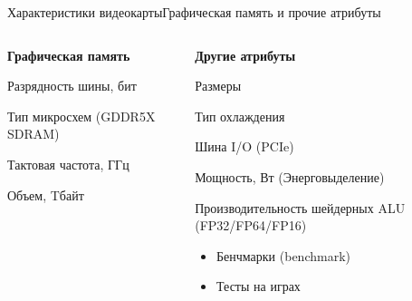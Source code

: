 \documentclass{beamer}
\begin{document}
\begin{frame}{Характеристики видеокарты}{Графическая память и прочие атрибуты}
	\begin{columns}
		\begin{column}{0.5\textwidth}

			\textbf{Графическая память}
			
			Разрядность шины, бит
			
			Тип микросхем (GDDR5X SDRAM)
			
			Тактовая частота, ГГц
			
			Объем, Tбайт

			\vspace{25mm}
		\end{column}
		\begin{column}{0.5\textwidth}
			\textbf{Другие атрибуты}
			
			Размеры
			
			Тип охлаждения
			
			Шина I/O (PCIe)
			
			Мощность, Вт (Энерговыделение)
			
			Производительность шейдерных  ALU (FP32/FP64/FP16)
			\begin{itemize}
				\item 
				Бенчмарки (benchmark)
				\item 
				Тесты на играх
			\end{itemize}
			
		\end{column}
	\end{columns}
\end{frame}
\end{document}
